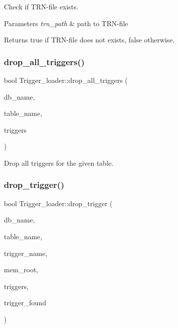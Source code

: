 Check if T\+RN-\/file exists.


\begin{DoxyParams}{Parameters}
{\em trn\+\_\+path} & path to T\+RN-\/file\\
\hline
\end{DoxyParams}
\begin{DoxyReturn}{Returns}
true if T\+RN-\/file does not exists, false otherwise. 
\end{DoxyReturn}
\mbox{\label{classTrigger__loader_a0ac0a2bcb6a58a137bfaabc3380b2ca3}} 
\subsubsection{\texorpdfstring{drop\+\_\+all\+\_\+triggers()}{drop\_all\_triggers()}}
{\footnotesize\ttfamily bool Trigger\+\_\+loader\+::drop\+\_\+all\+\_\+triggers (\begin{DoxyParamCaption}\item[{const char $\ast$}]{db\+\_\+name,  }\item[{const char $\ast$}]{table\+\_\+name,  }\item[{\mbox{\hyperlink{classList}{List}}$<$ \mbox{\hyperlink{classTrigger}{Trigger}} $>$ $\ast$}]{triggers }\end{DoxyParamCaption})\hspace{0.3cm}{\ttfamily [static]}}

Drop all triggers for the given table. \mbox{\label{classTrigger__loader_af096f75cbf2411b74572fa71fa2f6612}} 
\subsubsection{\texorpdfstring{drop\+\_\+trigger()}{drop\_trigger()}}
{\footnotesize\ttfamily bool Trigger\+\_\+loader\+::drop\+\_\+trigger (\begin{DoxyParamCaption}\item[{const L\+E\+X\+\_\+\+S\+T\+R\+I\+NG \&}]{db\+\_\+name,  }\item[{const L\+E\+X\+\_\+\+S\+T\+R\+I\+NG \&}]{table\+\_\+name,  }\item[{const L\+E\+X\+\_\+\+S\+T\+R\+I\+NG \&}]{trigger\+\_\+name,  }\item[{M\+E\+M\+\_\+\+R\+O\+OT $\ast$}]{mem\+\_\+root,  }\item[{\mbox{\hyperlink{classList}{List}}$<$ \mbox{\hyperlink{classTrigger}{Trigger}} $>$ $\ast$}]{triggers,  }\item[{bool $\ast$}]{trigger\+\_\+found }\end{DoxyParamCaption})\hspace{0.3cm}{\ttfamily [static]}}

